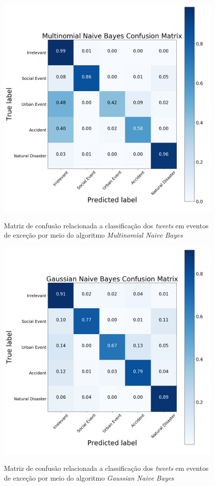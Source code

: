 \documentclass[
	12pt,				%
	oneside,			%
	a4paper,			%
	english,			%
	brazil				%
	]{abntex2ppgsi}
\begin{document}
\begin{apendicesenv}
\begin{figure}[!htb]
	\centering
 	  \caption{Matriz de confusão relacionada a classificação dos \textit{tweets} em eventos de exceção por meio do algoritmo \textit{Multinomial Naive Bayes}}
		\includegraphics[width=1\linewidth]{images/confusion_matrix_mnb.png}
	\label{fig:confusion_matrix_mnb}
\end{figure}

\begin{figure}[!htb]
	\centering
 	  \caption{Matriz de confusão relacionada a classificação dos \textit{tweets} em eventos de exceção por meio do algoritmo \textit{Gaussian Naive Bayes}}
		\includegraphics[width=1\linewidth]{images/confusion_matrix_gnb.png}
	\label{fig:confusion_matrix_gnb}
\end{figure}


\end{apendicesenv}
\end{document}
